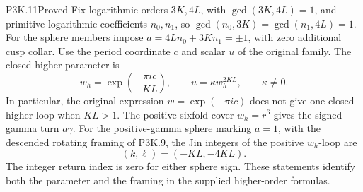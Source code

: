 \begin{statement}{P3K.11}{Proved}
Fix logarithmic orders \(3K,4L\), with
\(\gcd(3K,4L)=1\), and primitive logarithmic coefficients
\(n_0,n_1\), so \(\gcd(n_0,3K)=\gcd(n_1,4L)=1\).
For the sphere members impose
\(a=4L n_0+3K n_1=\pm1\), with zero additional cusp collar.
Use the period coordinate \(c\) and scalar \(u\) of the original
family.  The closed higher parameter is
\[
 w_h=\exp\!\left(-\frac{\pi i c}{KL}\right),
 \qquad u=\kappa w_h^{2KL},\qquad \kappa\ne0.
\]
In particular, the original expression \(w=\exp(-\pi i c)\)
does not give one closed higher loop when \(KL>1\).
The positive sixfold cover \(w_h=r^6\) gives the signed
gamma turn \(a\gamma\).  For the positive-gamma sphere marking
\(a=1\), with the descended rotating framing of P3K.9, the Jin
integers of the positive \(w_h\)-loop are
\[
                  (k,\ell)=(-KL,-4KL).
\]
The integer return index is zero for either sphere sign.
These statements identify
both the parameter and the framing in the supplied higher-order
formulas.
\end{statement}

